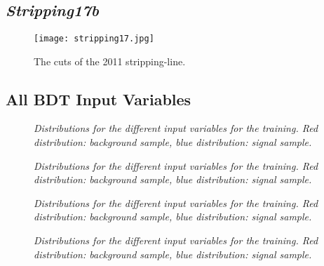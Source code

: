 \chapter{\appendixname}

\section*{\BdKstee \textit{Stripping17b}}
\label{ap:strip17}
\begin{figure}[!h]
\begin{center}
\texttt{[image: stripping17.jpg]}
\end{center}
\label{stripping17}
\caption{The cuts of the 2011 \BdKstee stripping-line.}
\end{figure}
\newpage

\section*{All BDT Input Variables}
\label{ap:allvars}
\begin{figure}[!h]
\begin{center}
\end{center}
\label{fig:varBDTa}
\caption{\textit{Distributions for the different input variables for the \bdta training. Red distribution: background sample, blue distribution: signal sample.}}
\end{figure}
\newpage
\begin{figure}[!h]
\begin{center}
\end{center}
\label{fig:varBDTa2}
\caption{\textit{Distributions for the different input variables for the \bdta training. Red distribution: background sample, blue distribution: signal sample.}}
\end{figure}

\newpage

\begin{figure}[!h]
\begin{center}
\end{center}
\label{fig:varBDTa}
\caption{\textit{Distributions for the different input variables for the \bdtb training. Red distribution: background sample, blue distribution: signal sample.}}
\end{figure}
\vspace*{5cm}
\begin{figure}[!h]
\begin{center}
\end{center}
\label{fig:varBDTa2}
\caption{\textit{Distributions for the different input variables for the \bdtb training. Red distribution: background sample, blue distribution: signal sample.}}
\end{figure}

